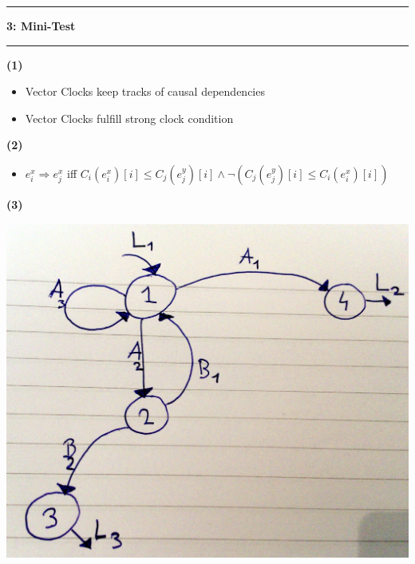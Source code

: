 \documentclass[11pt]{article}
\newcommand\question[2]{\vspace{.25in}\hrule\textbf{#1: #2}\vspace{.5em}\hrule\vspace{.10in}}
\renewcommand\part[1]{\vspace{.10in}\textbf{(#1)}}
\begin{document}
\raggedright

\newcommand\NAME{Lukas Gianinazzi, Young Ban, Vincent Demotz}  %

\question{3}{Mini-Test}

\part{1}

\begin{itemize}
	\item Vector Clocks keep tracks of causal dependencies
	\item Vector Clocks fulfill strong clock condition
\end{itemize}

\part{2}

\begin{itemize}
\item$e^{x}_{i} \Rightarrow e^{x}_{j}$ iff $C_{i} (e^{x}_{i})[i] \leq C_{j} (e^{y}_{j})[i] \wedge 
\neg ( C_{j} (e^{y}_{j})[i] \leq C_{i} (e^{x}_{i})[i])$
\end{itemize}

\clearpage

\part{3}

\includegraphics[scale=0.15]{registrationStates.jpg}
\end{document}
